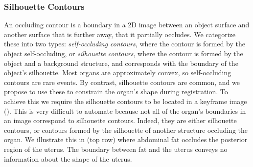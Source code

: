 



\subsubsection{Silhouette Contours}
An occluding contour is a boundary in a 2D image between an object surface and another surface that is further away, that it partially occludes. We categorize these into two types: \emph{self-occluding contours}, where the contour is formed by the object self-occluding, or \emph{silhouette contours}, where the contour is formed by the object and a background structure, and corresponds with the boundary of the object's silhouette. Most organs are approximately convex, so self-occluding contours are rare events. By contrast, silhouette contours are common, and we propose to use these to constrain the organ's shape during registration.  To achieve this we require the silhouette contours to be located in a keyframe image (). This is very difficult to automate because not all of the organ's boundaries in an image correspond to silhouette contours. Indeed, they are either silhouette contours, or contours formed by the silhouette of another structure occluding the organ. We illustrate this in  (top row) where abdominal fat occludes the posterior region of the uterus. The boundary between fat and the uterus conveys no information about the shape of the uterus.  

